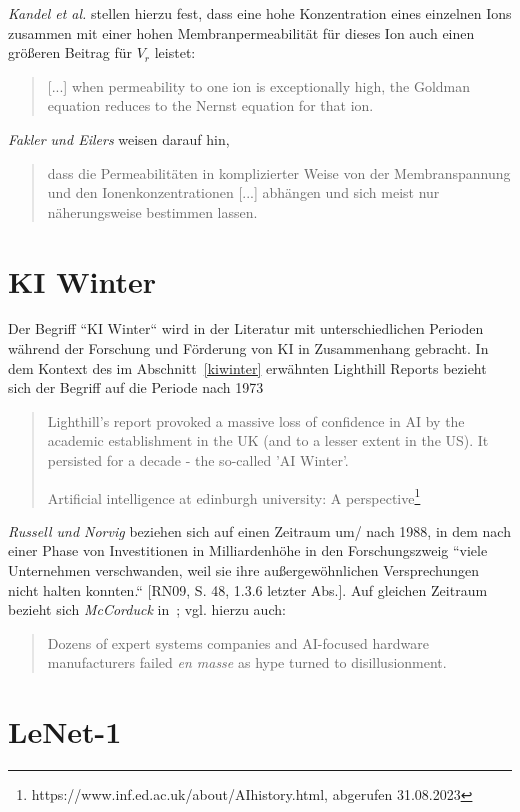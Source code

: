 {\textit{Kandel et al.} stellen hierzu fest, dass eine hohe Konzentration eines einzelnen Ions zusammen mit einer hohen Membranpermeabilität für dieses Ion auch einen größeren Beitrag für $V_r$ leistet:

\blockquote[{\cite[135]{KSJ+13}}]{
    {[...]} when permeability to one ion is exceptionally high, the Goldman equation reduces to the Nernst equation for that ion.
}

\textit{Fakler und Eilers} weisen darauf hin,

\blockquote[{\cite[67]{FE19}}]{
    dass die Permeabilitäten in komplizierter Weise von der Membranspannung und den Ionenkonzentrationen {[...]} abhängen und sich meist nur näherungsweise bestimmen lassen.
}




\section{KI Winter}\label{appendix:kiwinter}

Der Begriff ``KI Winter`` wird in der Literatur mit unterschiedlichen Perioden während der Forschung und Förderung von KI in Zusammenhang gebracht.
In dem Kontext des im Abschnitt~\ref{kiwinter} erwähnten Lighthill Reports bezieht sich der Begriff auf die Periode nach 1973

\blockquote[Artificial intelligence at edinburgh university: A perspective\footnote{https://www.inf.ed.ac.uk/about/AIhistory.html, abgerufen 31.08.2023}]{
    Lighthill's report provoked a massive loss of confidence in AI by the academic establishment in the UK (and to a lesser extent in the US). It persisted for a decade - the so-called 'AI Winter'.
}

\noindent
\textit{Russell und Norvig} beziehen sich auf einen Zeitraum um/ nach 1988, in dem nach einer Phase von Investitionen in Milliardenhöhe in den Forschungszweig ``viele Unternehmen verschwanden, weil sie ihre außergewöhnlichen Versprechungen nicht halten konnten.`` [RN09, S. 48, 1.3.6 letzter Abs.]. Auf gleichen Zeitraum bezieht sich \textit{McCorduck} in~\cite[432]{Mcc04}; vgl. hierzu auch:

\blockquote[{\cite[656]{Gar19}}]{
    Dozens of expert systems companies and AI-focused hardware manufacturers failed \textit{en masse} as hype turned to disillusionment.
}



\section{LeNet-1}\label{appendix:lenet1}

}
